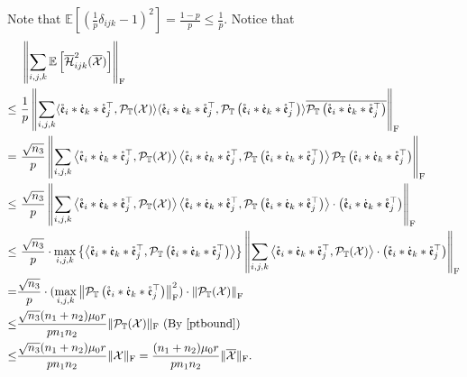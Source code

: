 \documentclass[twoside,12pt]{article}
\def\fro{{\mathrm{F}}}
\def\fro{{\mathrm{F}}}
\def\dme{{\dot{\mathfrak{e}}}}
\def\mrme{{\mathring{\mathfrak{e}}}}
\begin{document}
Note that $\mathbb{E}\left[\left( \frac{1}{p}\delta_{i j k}-1\right)^2\right] =\frac{1-p}{p}\leq \frac{1}{p}$.
Notice that
\begin{align*}
&~\left\|\sum_{i,j,k} \mathbb{E}\left[\overline{\mathcal{H}}_{ijk}^2(\overline{\mathcal{X}})\right]\right\|_{\fro} \\
\leq&~ \frac{1}{p} \left\|\sum_{i,j,k}\langle\mrme_{i} * \dme_{k} * \mrme_j^{\top}, \mathcal{P}_{\mathbb{T}}(\mathcal{X})\rangle \langle\mrme_{i} * \dme_{k} * \mrme_{j}^{\top}, \mathcal{P}_{\mathbb{T}}\left(\mrme_{i} * \dme_k * \mrme_{j}^{\top}\right)\rangle
\overline{\mathcal{P}_{\mathbb{T}}\left(\mrme_i * \dme_k * \mrme_j^{\top}\right)}\right\|_{\fro} \\ 
=&~\frac{\sqrt{n_3}}{p}\left\|\sum\limits_{i,j,k}\left\langle\mrme_{i} * \dme_{k} * \mrme_j^{\top}, \mathcal{P}_{\mathbb{T}}(\mathcal{X})\right\rangle\left\langle\mrme_{i} * \dme_{k} * \mrme_{j}^{\top}, \mathcal{P}_{\mathbb{T}}\left(\mrme_{i} * \dme_k * \mrme_{j}^{\top}\right)\right\rangle\mathcal{P}_{\mathbb{T}}\left(\mrme_{i} * \dme_k * \mrme_{j}^{\top}\right)\right\|_{\fro}\\
\leq&~\frac{\sqrt{n_3}}{p}\left\|\sum\limits_{i,j,k}\left\langle\mrme_{i} * \dme_{k} * \mrme_j^{\top}, \mathcal{P}_{\mathbb{T}}(\mathcal{X})\right\rangle\left\langle\mrme_{i} * \dme_{k} * \mrme_{j}^{\top}, \mathcal{P}_{\mathbb{T}}\left(\mrme_{i} * \dme_k * \mrme_{j}^{\top}\right)\right\rangle\cdot \left(\mrme_{i} * \dme_k * \mrme_{j}^{\top}\right)\right\|_{\fro}\\
\leq&~ \frac{\sqrt{n_3}}{p}\cdot \max\limits_{i,j,k}\left\{\left\langle\mrme_{i} * \dme_{k} * \mrme_{j}^{\top}, \mathcal{P}_{\mathbb{T}}\left(\mrme_{i} * \dme_k * \mrme_{j}^{\top}\right)\right\rangle\right\}\left\|\sum\limits_{i,j,k}\left\langle\mrme_{i} * \dme_{k} * \mrme_j^{\top}, \mathcal{P}_{\mathbb{T}}(\mathcal{X})\right\rangle\cdot \left(\mrme_{i} * \dme_k * \mrme_{j}^{\top}\right)\right\|_{\fro}\\
=&\frac{\sqrt{n_3}}{p}\cdot(\max\limits_{i,j,k}\left\|\mathcal{P}_{\mathbb{T}}\left(\mrme_{i} * \dme_k * \mrme_{j}^{\top}\right)\right\|_{\fro}^2)\cdot \left\|\mathcal{P}_{\mathbb{T}}(\mathcal{X})\right\|_{\fro}\\
\leq& \frac{\sqrt{n_3} (n_1 +n_2) \mu_{0} r}{ pn_{1}n_{2}}\|\mathcal{P}_{\mathbb{T}}(\mathcal{X})\|_{\fro} \text{ (By \Cref{ptbound})} \\
\leq&\frac{\sqrt{n_3}(n_1+n_2)\mu_{0} r}{ pn_{1}n_{2}}\|\mathcal{X}\|_{\fro}=\frac{(n_1+n_2)\mu_{0} r}{ pn_{1}n_{2}}\|\overline{\mathcal{X}}\|_{\fro}.
\end{align*}
\end{document}
